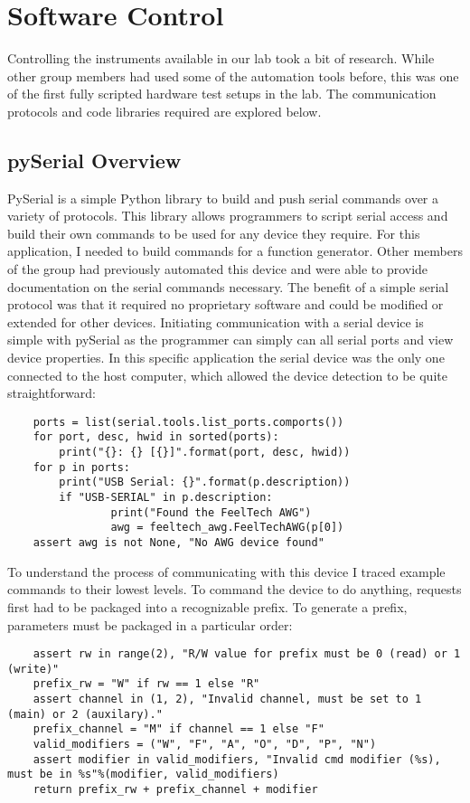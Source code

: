 \section{Software Control}
Controlling the instruments available in our lab took a bit of research. While other group members had used some of the automation tools before, this was one of the first fully scripted hardware test setups in the lab. The communication protocols and code libraries required are explored below.
\subsection{pySerial Overview}
PySerial is a simple Python library to build and push serial commands over a variety of protocols. This library allows programmers to script serial access and build their own commands to be used for any device they require. For this application, I needed to build commands for a function generator. Other members of the group had previously automated this device and were able to provide documentation on the serial commands necessary. The benefit of a simple serial protocol was that it required no proprietary software and could be modified or extended for other devices. Initiating communication with a serial device is simple with pySerial as the programmer can simply can all serial ports and view device properties. In this specific application the serial device was the only one connected to the host computer, which allowed the device detection to be quite straightforward:\par
\begin{lstlisting}
	ports = list(serial.tools.list_ports.comports())
	for port, desc, hwid in sorted(ports):
		print("{}: {} [{}]".format(port, desc, hwid))
	for p in ports:
		print("USB Serial: {}".format(p.description))
		if "USB-SERIAL" in p.description:
				print("Found the FeelTech AWG")
				awg = feeltech_awg.FeelTechAWG(p[0])
	assert awg is not None, "No AWG device found"
\end{lstlisting}
To understand the process of communicating with this device I traced example commands to their lowest levels. To command the device to do anything, requests first had to be packaged into a recognizable prefix. To generate a prefix, parameters must be packaged in a particular order: \par
\begin{lstlisting}
	assert rw in range(2), "R/W value for prefix must be 0 (read) or 1 (write)"
	prefix_rw = "W" if rw == 1 else "R"
	assert channel in (1, 2), "Invalid channel, must be set to 1 (main) or 2 (auxilary)."
	prefix_channel = "M" if channel == 1 else "F"
	valid_modifiers = ("W", "F", "A", "O", "D", "P", "N")
	assert modifier in valid_modifiers, "Invalid cmd modifier (%s), must be in %s"%(modifier, valid_modifiers)
	return prefix_rw + prefix_channel + modifier
\end{lstlisting}
